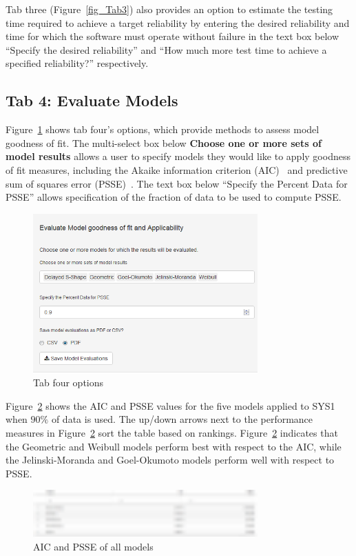 \documentclass[conference]{IEEEtran}
\begin{document}
Tab three (Figure~\ref{fig_Tab3}) also provides an option to estimate the testing time required to achieve a target reliability by entering the desired reliability and time for which the software must operate without failure in the text box below ``Specify the desired reliability'' and ``How much more test time to achieve a specified reliability?'' respectively.


\subsection{Tab 4: Evaluate Models}\label{tab4}
Figure~\ref{fig_SRT_tab4} shows tab four's options, which provide methods to assess model goodness of fit. The multi-select box below \textbf{Choose one or more sets of model results} allows a user to specify models they would like to apply goodness of fit measures, including the Akaike information criterion (AIC)~\cite{akaike1974new} and predictive sum of squares error (PSSE)~\cite{fiondella2011software}. The text box below ``Specify the Percent Data for PSSE'' allows specification of the fraction of data to be used to compute PSSE.

\begin{figure}[!h]
\centering
\includegraphics[width=3.4in]{Figures/Fig16}
\caption{Tab four options}
\label{fig_SRT_tab4}
\end{figure}

Figure~\ref{fig_SRT_tab4_table} shows the AIC and PSSE values for the five models applied to SYS1 when $90\%$ of data is used. The up/down arrows next to the performance measures in Figure~\ref{fig_SRT_tab4_table} sort the table based on rankings. Figure~\ref{fig_SRT_tab4_table} indicates that the Geometric and Weibull models perform best with respect to the AIC, while the Jelinski-Moranda and Goel-Okumoto models perform well with respect to PSSE.


\begin{figure}[!h]
\centering
\includegraphics[width=3.4in]{Figures/SRT_tab4_table}
\caption{AIC and PSSE of all models}
\label{fig_SRT_tab4_table}
\end{figure}
\end{document}
